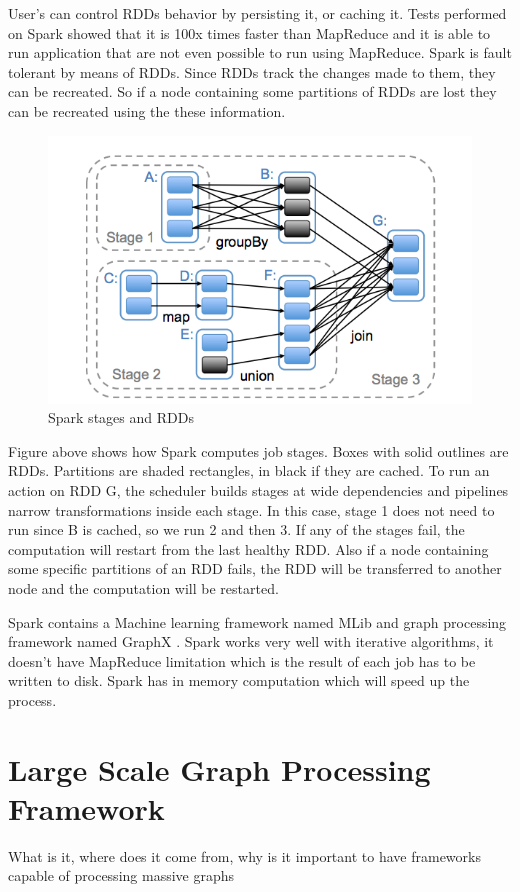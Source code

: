 \documentclass[english]{tktltiki}
\begin{document}
 User's can control RDDs behavior by persisting it, or caching it. Tests performed on Spark showed that it is 100x times faster than MapReduce and it is able to run application that are not even possible to run using MapReduce. Spark is fault tolerant by means of RDDs. Since RDDs track the changes made to them, they can be recreated. So if a node containing some partitions of RDDs are lost they can be recreated using the these information. 
 
\begin{figure}[ht!]
\centering
\includegraphics[width=130mm]{figures/rdd.png}
\caption{Spark stages and RDDs}
\end{figure}
Figure above shows how Spark computes job stages. Boxes with solid outlines are RDDs. Partitions are shaded rectangles, in black if they are cached. To run an action on RDD G, the scheduler builds stages at wide dependencies and pipelines narrow transformations inside each stage. In this case, stage 1 does not need to run since B is cached, so we run 2 and then 3. If any of the stages fail, the computation will restart from the last healthy RDD. Also if a node containing some specific partitions of an RDD fails, the RDD will be transferred to another node and the computation will be restarted. 

Spark contains a Machine learning framework named MLib and graph processing framework named GraphX . 
Spark works very well with iterative algorithms, it doesn't have MapReduce limitation which is the result of each job has to be written to disk. Spark has in memory computation which will speed up the process. 
\newpage

\section{Large Scale Graph Processing Framework}
What is it, where does it come from, why is it important to have frameworks capable of processing massive graphs
\end{document}
